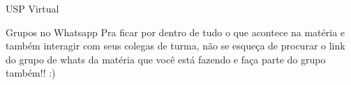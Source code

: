 \begin{secao}{USP Virtual}
\begin{subsecao}{Grupos no Whatsapp}
Pra ficar por dentro de tudo o que acontece na matéria e também interagir com seus colegas
de turma, não se esqueça de procurar o link do grupo de whats da matéria que você está fazendo
e faça parte do grupo também!! :)

\end{subsecao}


\end{secao}
